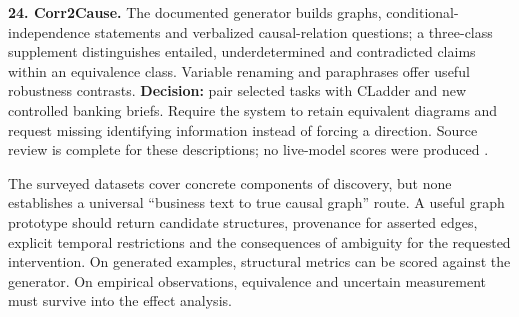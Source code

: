 \textbf{24. Corr2Cause.} The documented generator builds graphs,
conditional-independence statements and verbalized causal-relation
questions; a three-class supplement distinguishes entailed,
underdetermined and contradicted claims within an equivalence class.
Variable renaming and paraphrases offer useful robustness contrasts.
\textbf{Decision:} pair selected tasks with CLadder and new controlled
banking briefs. Require the system to retain equivalent diagrams and
request missing identifying information instead of forcing a direction.
Source review is complete for these descriptions; no live-model scores
were produced \citep{pd15_corr2cause_pinned}.

The surveyed datasets cover concrete components of discovery, but none
establishes a universal ``business text to true causal graph'' route. A
useful graph prototype should return candidate structures, provenance
for asserted edges, explicit temporal restrictions and the consequences
of ambiguity for the requested intervention. On generated examples,
structural metrics can be scored against the generator. On empirical
observations, equivalence and uncertain measurement must survive into
the effect analysis.

